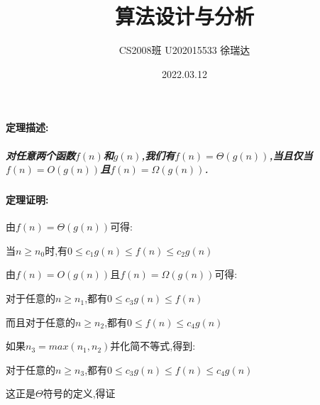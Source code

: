 \documentclass[a4paper]{article}
\title{\heiti\zihao{2} 算法设计与分析}
\author{\songti CS2008班   U202015533  徐瑞达}
\date{2022.03.12}
\begin{document}
\maketitle
\paragraph{定理描述:}
\subparagraph{对任意两个函数$f(n)$和$g(n)$,我们有$f(n)=\Theta(g(n))$,当且仅当$f(n)=O(g(n))$且$f(n)=\Omega(g(n))$.}
\paragraph{定理证明:}
\begin{flushleft}
    由$f(n)=\Theta(g(n))$可得:
    \centerline{当$n \ge n_{0}$时,有$0 \leq c_{1}g(n) \leq f(n) \leq c_{2}g(n)$}
    由$f(n)=O(g(n))$且$f(n)=\Omega(g(n))$可得:
    \centerline{对于任意的$n \geq n_{1}$,都有$0 \leq c_{3}g(n) \leq f(n)$}
    \centerline{而且对于任意的$n \geq n_{2}$,都有$0 \leq  f(n) \leq c_{4}g(n)$}
    如果$n_{3}=max(n_{1},n_{2})$并化简不等式,得到:
    \centerline{对于任意的$n \geq n_{3}$,都有$0 \leq c_{3}g(n) \leq f(n) \leq c_{4}g(n)$}
    这正是$\Theta$符号的定义,得证
\end{flushleft}
\end{document}
